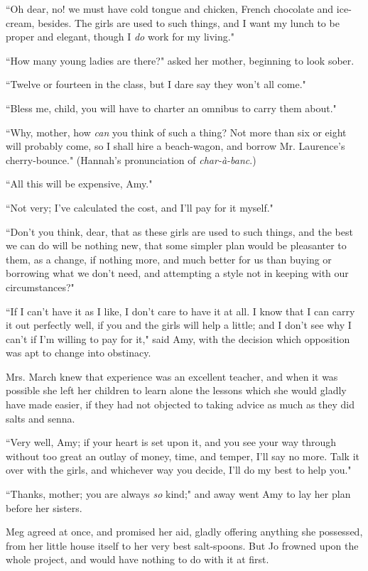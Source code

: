 ``Oh dear, no! we must have cold tongue and chicken, French chocolate and
ice-cream, besides. The girls are used to such things, and I want my
lunch to be proper and elegant, though I \emph{do} work for my living."

``How many young ladies are there?" asked her mother, beginning to look
sober.

``Twelve or fourteen in the class, but I dare say they
won't all come."

``Bless me, child, you will have to charter an omnibus to carry them
about."

``Why, mother, how \emph{can} you think of such a thing? Not more than
six or eight will probably come, so I shall hire a beach-wagon, and
borrow Mr. Laurence's cherry-bounce."
(Hannah's pronunciation of \emph{char-à-banc}.)

``All this will be expensive, Amy."

``Not very; I've calculated the cost, and
I'll pay for it myself."

``Don't you think, dear, that as these girls are used to
such things, and the best we can do will be nothing new, that some
simpler plan would be pleasanter to them, as a change, if nothing more,
and much better for us than buying or borrowing what we
don't need, and attempting a style not in keeping with
our circumstances?"

``If I can't have it as I like, I don't
care to have it at all. I know that I can carry it out perfectly well,
if you and the girls will help a little; and I don't see
why I can't if I'm willing to pay for
it," said Amy, with the decision which opposition was apt to change into
obstinacy.

Mrs. March knew that experience was an excellent teacher, and when it
was possible she left her children to learn alone the lessons which she
would gladly have made easier, if they had not objected to taking advice
as much as they did salts and senna.

``Very well, Amy; if your heart is set upon it, and you see your way
through without too great an outlay of money, time, and temper,
I'll say no more. Talk it over with the girls, and
whichever way you decide, I'll do my best to help you."

``Thanks, mother; you are always \emph{so} kind;" and away went Amy to
lay her plan before her sisters.

Meg agreed at once, and promised her aid, gladly offering anything she
possessed, from her little house itself to her very best salt-spoons.
But Jo frowned upon the whole project, and would have nothing to do with
it at first.

